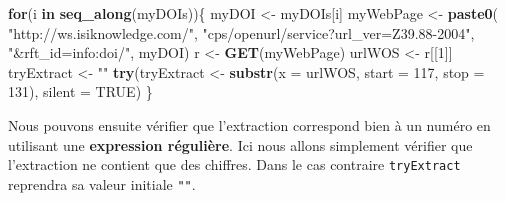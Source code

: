 \documentclass[
]{book}
\newenvironment{Shaded}{\begin{snugshade}}{\end{snugshade}}
\newcommand{\ControlFlowTok}[1]{\textcolor[rgb]{0.13,0.29,0.53}{\textbf{#1}}}
\newcommand{\DataTypeTok}[1]{\textcolor[rgb]{0.13,0.29,0.53}{#1}}
\newcommand{\DecValTok}[1]{\textcolor[rgb]{0.00,0.00,0.81}{#1}}
\newcommand{\KeywordTok}[1]{\textcolor[rgb]{0.13,0.29,0.53}{\textbf{#1}}}
\newcommand{\NormalTok}[1]{#1}
\newcommand{\OperatorTok}[1]{\textcolor[rgb]{0.81,0.36,0.00}{\textbf{#1}}}
\newcommand{\OtherTok}[1]{\textcolor[rgb]{0.56,0.35,0.01}{#1}}
\newcommand{\StringTok}[1]{\textcolor[rgb]{0.31,0.60,0.02}{#1}}
\begin{document}
\begin{Shaded}
\begin{Highlighting}[]
\ControlFlowTok{for}\NormalTok{(i }\ControlFlowTok{in} \KeywordTok{seq_along}\NormalTok{(myDOIs))\{}
\NormalTok{  myDOI <-}\StringTok{ }\NormalTok{myDOIs[i]}
\NormalTok{  myWebPage <-}\StringTok{ }\KeywordTok{paste0}\NormalTok{(}
    \StringTok{"http://ws.isiknowledge.com/"}\NormalTok{, }
    \StringTok{"cps/openurl/service?url_ver=Z39.88-2004"}\NormalTok{, }
    \StringTok{"&rft_id=info:doi/"}\NormalTok{, myDOI)}
\NormalTok{  r <-}\StringTok{ }\KeywordTok{GET}\NormalTok{(myWebPage)}
\NormalTok{  urlWOS <-}\StringTok{ }\NormalTok{r[[}\DecValTok{1}\NormalTok{]]}
\NormalTok{  tryExtract <-}\StringTok{ ""}
  \KeywordTok{try}\NormalTok{(tryExtract <-}\StringTok{ }\KeywordTok{substr}\NormalTok{(}\DataTypeTok{x =}\NormalTok{ urlWOS, }\DataTypeTok{start =} \DecValTok{117}\NormalTok{, }\DataTypeTok{stop =} \DecValTok{131}\NormalTok{), }\DataTypeTok{silent =} \OtherTok{TRUE}\NormalTok{)}
\NormalTok{\}}
\end{Highlighting}
\end{Shaded}

Nous pouvons ensuite vérifier que l'extraction correspond bien à un numéro en utilisant une \textbf{expression régulière}. Ici nous allons simplement vérifier que l'extraction ne contient que des chiffres. Dans le cas contraire \texttt{tryExtract} reprendra sa valeur initiale \texttt{""}.

\begin{Shaded}
\end{Shaded}
\end{document}

